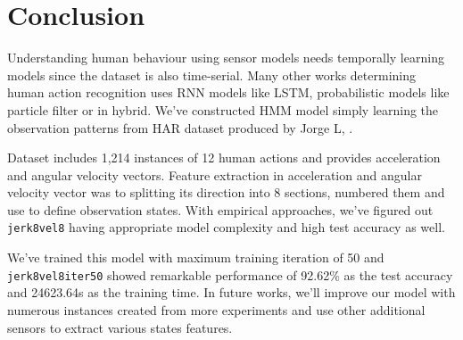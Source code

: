 \documentclass[10pt,letterpaper]{article}
\begin{document}
\section{Conclusion}
Understanding human behaviour using sensor models needs temporally learning models since the dataset is also time-serial. Many other works determining human action recognition uses RNN models like LSTM, probabilistic models like particle filter or in hybrid. We've constructed HMM model simply learning the observation patterns from HAR dataset produced by Jorge L, \etal.

Dataset includes 1,214 instances of 12 human actions and provides acceleration and angular velocity vectors. Feature extraction in acceleration and angular velocity vector was to splitting its direction into 8 sections, numbered them and use to define observation states. With empirical approaches, we've figured out \texttt{jerk8vel8} having appropriate model complexity and high test accuracy as well.

We've trained this model with maximum training iteration of 50 and \texttt{jerk8vel8iter50} showed remarkable performance of 92.62\% as the test accuracy and 24623.64s as the training time. In future works, we'll improve our model with numerous instances created from more experiments and use other additional sensors to extract various states features.
\end{document}
